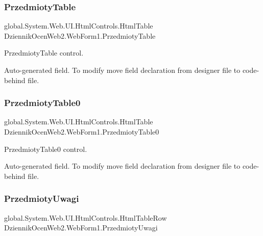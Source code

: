 \subsubsection{\texorpdfstring{Przedmioty\+Table}{PrzedmiotyTable}}
{\footnotesize\ttfamily global.\+System.\+Web.\+U\+I.\+Html\+Controls.\+Html\+Table Dziennik\+Ocen\+Web2.\+Web\+Form1.\+Przedmioty\+Table\hspace{0.3cm}{\ttfamily [protected]}}



Przedmioty\+Table control. 

Auto-\/generated field. To modify move field declaration from designer file to code-\/behind file. \mbox{\label{class_dziennik_ocen_web2_1_1_web_form1_ae07ff54c565a4fd8deaa4b074af896cf}} 
\subsubsection{\texorpdfstring{Przedmioty\+Table0}{PrzedmiotyTable0}}
{\footnotesize\ttfamily global.\+System.\+Web.\+U\+I.\+Html\+Controls.\+Html\+Table Dziennik\+Ocen\+Web2.\+Web\+Form1.\+Przedmioty\+Table0\hspace{0.3cm}{\ttfamily [protected]}}



Przedmioty\+Table0 control. 

Auto-\/generated field. To modify move field declaration from designer file to code-\/behind file. \mbox{\label{class_dziennik_ocen_web2_1_1_web_form1_af38d3b4fdef8737b1b414b0bf6ca6b60}} 
\subsubsection{\texorpdfstring{Przedmioty\+Uwagi}{PrzedmiotyUwagi}}
{\footnotesize\ttfamily global.\+System.\+Web.\+U\+I.\+Html\+Controls.\+Html\+Table\+Row Dziennik\+Ocen\+Web2.\+Web\+Form1.\+Przedmioty\+Uwagi\hspace{0.3cm}{\ttfamily [protected]}}



